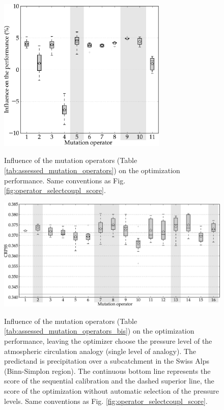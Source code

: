 \documentclass{ametsoc}
\begin{document}
\begin{figure}[t]
	\begin{center}
		\noindent\includegraphics[width=19pc,angle=0]{fig06.pdf}\\
	\end{center}
	\caption{Influence of the mutation operators (Table \ref{tab:assessed_mutation_operators}) on the optimization performance. Same conventions as Fig. \ref{fig:operator_selectcoupl_score}.}
	\label{fig:operator_mutation_score}
\end{figure}

\begin{figure}[t]
	\begin{center}
		\noindent\includegraphics[width=33pc,angle=0]{fig07.pdf}\\
	\end{center}
	\caption{Influence of the mutation operators (Table \ref{tab:assessed_mutation_operators_bis}) on the optimization performance, leaving the optimizer choose the pressure level of the atmospheric circulation analogy (single level of analogy). The predictand is precipitation over a subcatchment in the Swiss Alps (Binn-Simplon region). The continuous bottom line represents the score of the sequential calibration and the dashed superior line, the score of the optimization without automatic selection of the pressure levels. Same conventions as Fig. \ref{fig:operator_selectcoupl_score}.}
	\label{fig:operator_mutation_score_atmlevel}
\end{figure}
\end{document}
